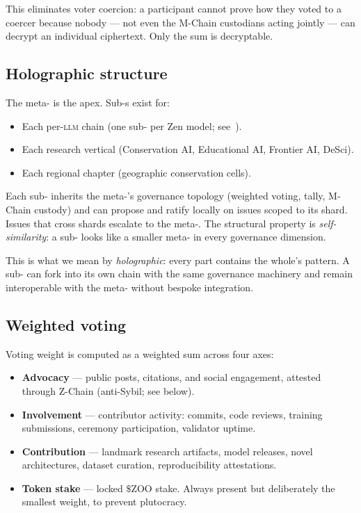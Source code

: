 This eliminates voter coercion: a participant cannot prove how they
voted to a coercer because nobody --- not even the M-Chain custodians
acting jointly --- can decrypt an individual ciphertext. Only the sum
is decryptable.

\subsection{Holographic structure}

The meta-\DAO{} is the apex. Sub-\DAO{}s exist for:

\begin{itemize}[nosep,leftmargin=1.2em]
\item Each per-\textsc{llm} chain (one sub-\DAO{} per Zen model;
  see~\cite{zoo-per-llm-chains}).
\item Each research vertical (Conservation AI, Educational AI,
  Frontier AI, DeSci).
\item Each regional chapter (geographic conservation cells).
\end{itemize}

Each sub-\DAO{} inherits the meta-\DAO{}'s governance topology
(weighted voting, \FHE{} tally, M-Chain custody) and can propose and
ratify locally on issues scoped to its shard. Issues that cross shards
escalate to the meta-\DAO{}. The structural property is
\emph{self-similarity}: a sub-\DAO{} looks like a smaller meta-\DAO{}
in every governance dimension.

This is what we mean by \emph{holographic}: every part contains the
whole's pattern. A sub-\DAO{} can fork into its own chain with the same
governance machinery and remain interoperable with the meta-\DAO{}
without bespoke integration.

\subsection{Weighted voting}
\label{sec:weighted}

Voting weight is computed as a weighted sum across four axes:

\begin{itemize}[nosep,leftmargin=1.2em]
\item \textbf{Advocacy} --- public posts, citations, and social
  engagement, attested through Z-Chain (anti-Sybil; see below).
\item \textbf{Involvement} --- contributor activity: commits, code
  reviews, training submissions, ceremony participation, validator
  uptime.
\item \textbf{Contribution} --- landmark research artifacts, model
  releases, novel architectures, dataset curation, reproducibility
  attestations.
\item \textbf{Token stake} --- locked $\$$ZOO stake. Always present
  but deliberately the smallest weight, to prevent plutocracy.
\end{itemize}

